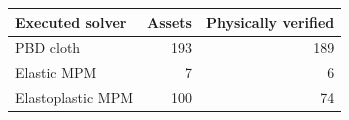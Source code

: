 \begin{tabular}{lrr}
\toprule
Executed solver & Assets & Physically verified \\
\midrule
PBD cloth & 193 & 189 \\
Elastic MPM & 7 & 6 \\
Elastoplastic MPM & 100 & 74 \\
\bottomrule
\end{tabular}
